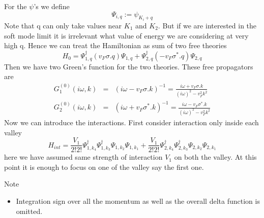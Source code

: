 \documentclass[a4paper,crop=false]{standalone}
\begin{document}
        For the $\psi$'s we define
        \begin{equation}
            \Psi_{i,q} := \psi_{K_i + q}
        \end{equation}
        Note that q can only take values near $K_1$ and $K_2$. But if we are interested in the soft mode limit it is irrelevant what value of energy we are considering at very high q. Hence we can treat the Hamiltonian as sum of two free theories
        \begin{equation}
            H_0 = \Psi^{\dagger}_{1,q} (v_F \sigma . q) \Psi_{1,q} + \Psi^{\dagger}_{2,q} (- v_F \sigma^* . q)\Psi_{2,q}
        \end{equation}
        Then we have two Green's function for the two theories. These free propagators are
        \begin{eqnarray}
            G^{(0)}_{1}(i\omega,k) &=& (i\omega - v_F\sigma . k)^{-1} = \frac{i\omega + v_F\sigma . k}{(i\omega)^2 - v^2_F k^2}\\
            G^{(0)}_{2}(i\omega,k) &=& (i\omega + v_F\sigma^* . k)^{-1} = \frac{i\omega - v_F\sigma^* . k}{(i\omega)^2 - v^2_F k^2}
        \end{eqnarray}
        Now we can introduce the interactions. First consider interaction only inside each valley
        \begin{equation}
            H_{int} = \frac{V_1}{2!2!} \Psi^{\dagger}_{1,k_4}\Psi^{\dagger}_{1,k_3}\Psi_{1,k_2}\Psi_{1,k_1} + \frac{V_1}{2!2!} \Psi^{\dagger}_{2,k_4}\Psi^{\dagger}_{2,k_3}\Psi_{2,k_2}\Psi_{2,k_1}
        \end{equation}
        here we have assumed same strength of interaction $V_1$ on both the valley.
        At this point it is enough to focus on one of the valley say the first one.
        \begin{mybox}[colback=white]{Note}
            \begin{itemize}
                \item Integration sign over all the momentum as well as the overall delta function is omitted.
            \end{itemize}
        \end{mybox}
\end{document}
